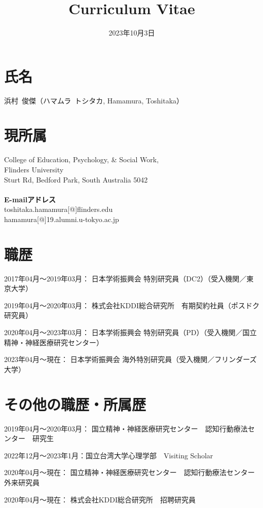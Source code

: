 \documentclass[11pt,a4paper]{article}
\begin{document}
\title{Curriculum Vitae}
\date{2023年10月3日}
\maketitle

\noindent
\section{氏名}
浜村\ 俊傑（ハマムラ\ トシタカ, Hamamura, Toshitaka）
\section{現所属}
College of Education, Psychology, \& Social Work,\\
Flinders University\\
Sturt Rd, Bedford Park, South Australia 5042\\~\\
\textbf{E-mailアドレス}\\
toshitaka.hamamura[@]flinders.edu\\
hamamura[@]19.alumni.u-tokyo.ac.jp\\

\section{職歴}
\begin{description}
	\item 2017年04月～2019年03月： 日本学術振興会 特別研究員（DC2）（受入機関／東京大学）
	\item 2019年04月～2020年03月： 株式会社KDDI総合研究所　有期契約社員（ポスドク研究員）
	\item 2020年04月～2023年03月： 日本学術振興会 特別研究員（PD）（受入機関／国立精神・神経医療研究センター）
	\item 2023年04月～現在： 日本学術振興会 海外特別研究員（受入機関／フリンダーズ大学）
\end{description}

\section{その他の職歴・所属歴}
\begin{description}
	\item 2019年04月～2020年03月： 国立精神・神経医療研究センター　認知行動療法センター　研究生
	\item 2022年12月～2023年1月：国立台湾大学心理学部　Visiting Scholar
	\item 2020年04月～現在： 国立精神・神経医療研究センター　認知行動療法センター　外来研究員
	\item 2020年04月～現在： 株式会社KDDI総合研究所　招聘研究員
\end{description}
\end{document}
